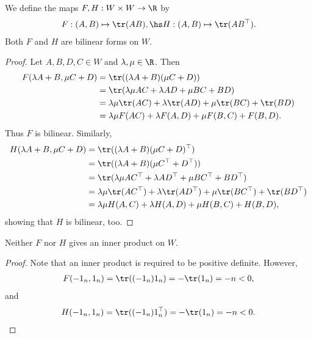 \documentclass{article}
\begin{document}
\begin{claim*}[1b]
	We define the maps $F,H:W\times W\to\R$ by
	\begin{align*}
		F:(A,B)\mapsto \tr(AB),\hs H:(A,B)\mapsto \tr(AB^\top).
	\end{align*}
	Both $F$ and $H$ are bilinear forms on $W$.
	\begin{proof}
		Let $A,B,D,C\in W$ and $\lambda,\mu\in\R$. Then
		\begin{align*}
			F(\lambda A+B,\mu C + D) & =\tr((\lambda A+B)(\mu C+D))                               \\
			                         & =\tr(\lambda\mu AC + \lambda AD + \mu BC + BD)             \\
			                         & =\lambda\mu\tr (AC) + \lambda\tr(AD) +\mu\tr(BC) + \tr(BD) \\
			                         & = \lambda\mu F(AC)+ \lambda F(A,D) + \mu F(B,C) + F(B,D).
		\end{align*}
		Thus $F$ is bilinear. Similarly,
		\begin{align*}
			H(\lambda A+B,\mu C + D) & =\tr((\lambda A+B)(\mu C+D)^\top)                                              \\
			                         & =\tr((\lambda A+B)(\mu C^\top + D^\top))                                       \\
			                         & =\tr(\lambda\mu AC^\top + \lambda AD^\top + \mu BC^\top + BD^\top)             \\
			                         & =\lambda\mu\tr (AC^\top) + \lambda\tr(AD^\top) +\mu\tr(BC^\top) + \tr(BD^\top) \\
			                         & = \lambda\mu H(A,C)+ \lambda H(A,D) + \mu H(B,C) + H(B,D),
		\end{align*}
		showing that $H$ is bilinear, too.
	\end{proof}
\end{claim*}

\begin{claim*}[1c]
	Neither $F$ nor $H$ gives an inner product on $W$.
	\begin{proof}
		Note that an inner product is required to be positive definite. However,
		\begin{align*}
			F(-1_n,1_n)=\tr((-1_n)1_n)=-\tr(1_n)=-n < 0,
		\end{align*}
		and
		\begin{align*}
			H(-1_n,1_n)=\tr((-1_n)1_n^\top)=-\tr(1_n)=-n<0.
		\end{align*}
	\end{proof}
\end{claim*}
\end{document}
